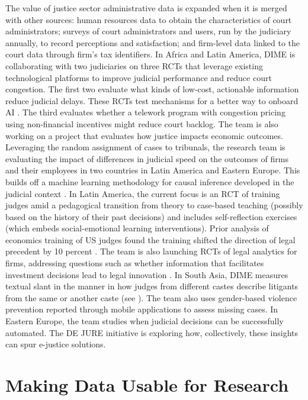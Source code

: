 The value of justice sector administrative data is expanded when it is merged with other sources: human resources data to obtain the characteristics of court administrators; surveys of court administrators and users, run by the judiciary annually, to record perceptions and satisfaction; and firm-level data linked to the court data through firm's tax identifiers. In Africa and Latin America, DIME is collaborating with two judiciaries on three RCTs that leverage existing technological platforms to improve judicial performance and reduce court congestion. The first two evaluate what kinds of low-cost, actionable information reduce judicial delays. These RCTs test mechanisms for a better way to onboard AI \citep[see][]{babic2020}. The third evaluates whether a telework program with congestion pricing using non-financial incentives might reduce court backlog. The team is also working on a project that evaluates how justice impacts economic outcomes. Leveraging the random assignment of cases to tribunals, the research team is evaluating the impact of differences in judicial speed on the outcomes of firms and their employees in two countries in Latin America and Eastern Europe. This builds off a machine learning methodology for causal inference developed in the judicial context \citep[see][]{babic2020}. In Latin America, the current focus is an RCT of training judges amid a pedagogical transition from theory to case-based teaching (possibly based on the history of their past decisions) and includes self-reflection exercises (which embeds social-emotional learning interventions). Prior analysis of economics training of US judges found the training shifted the direction of legal precedent by 10 percent \citep{galletta2019}. The team is also launching RCTs of legal analytics for firms, addressing questions such as whether information that facilitates investment decisions lead to legal innovation \citep{chen2015}. In South Asia, DIME measures textual slant in the manner in how judges from different castes describe litigants from the same or another caste (see \citet{ash2019}). The team also uses gender-based violence prevention reported through mobile applications to assess missing cases. In Eastern Europe, the team studies when judicial decisions can be successfully automated. The DE JURE initiative is exploring how, collectively, these insights can spur e-justice solutions.

\hypertarget{making-data-usable-for-research-5}{%
\section{Making Data Usable for Research}\label{making-data-usable-for-research-5}}

